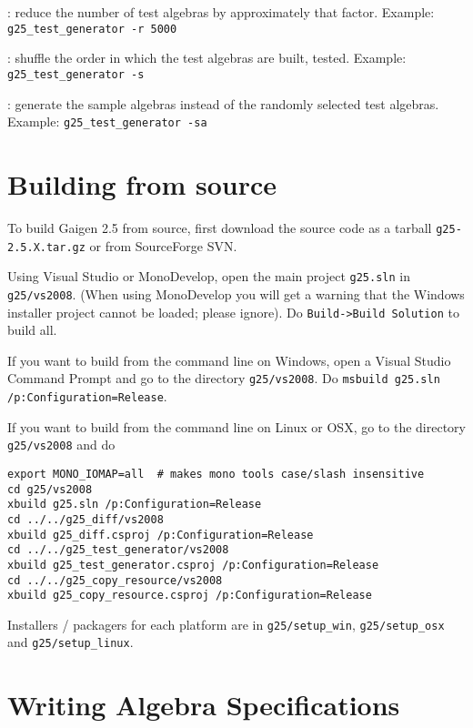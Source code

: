\documentclass[10pt, a4paper]{article}
\begin{document}
: reduce the number of test algebras by approximately that factor.
Example: {\tt g25\_test\_generator -r 5000}

\vspace*{2mm}

: shuffle the order in which the test algebras are built, tested.
Example: {\tt g25\_test\_generator -s}

\vspace*{2mm}

: generate the sample algebras instead of the randomly
selected test algebras.
Example: {\tt g25\_test\_generator -sa}

\section{Building from source}

To build Gaigen 2.5 from source, first download the source code as a tarball {\tt g25-2.5.X.tar.gz}
or from SourceForge SVN.

Using Visual Studio or MonoDevelop, open the main project {\tt g25.sln} in {\tt g25/vs2008}.
(When using MonoDevelop you will get a warning that the Windows installer project cannot be loaded; please ignore).
Do {\tt Build->Build Solution} to build all. 

If you want to build from the command line on Windows, open a Visual Studio Command Prompt and
go to the directory {\tt g25/vs2008}. Do {\tt msbuild g25.sln /p:Configuration=Release}.

If you want to build from the command line on Linux or OSX, go to the directory {\tt g25/vs2008}
and do 
\begin{verbatim}
export MONO_IOMAP=all  # makes mono tools case/slash insensitive
cd g25/vs2008
xbuild g25.sln /p:Configuration=Release
cd ../../g25_diff/vs2008
xbuild g25_diff.csproj /p:Configuration=Release
cd ../../g25_test_generator/vs2008
xbuild g25_test_generator.csproj /p:Configuration=Release
cd ../../g25_copy_resource/vs2008
xbuild g25_copy_resource.csproj /p:Configuration=Release
\end{verbatim}

Installers / packagers for each platform are in {\tt g25/setup\_win}, 
{\tt g25/setup\_osx} and {\tt g25/setup\_linux}.


\section{Writing Algebra Specifications}
\end{document}
